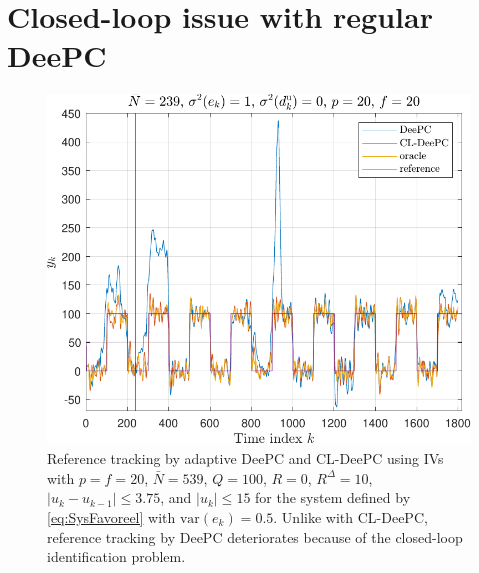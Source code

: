 \section{Closed-loop issue with regular \ac{DeePC}}\label{sec:CL_ID_issue}




\begin{figure}
\begin{center}
\includegraphics[width=\columnwidth]{results/figures/DeePC_CL_ID_issue_Re_1.mat_Nbar_239_p_20_f_20_Ru_1_Rdu_0_Q_100_R_0_dR_10.pdf}    %
\caption{Reference tracking by adaptive \ac{DeePC} and \ac{CL-DeePC} using \ac{IVs} with $p=f=20$, $\bar{N}=539$, $Q=100$, $R=0$, $R^\Delta=10$, $|u_k-u_{k-1}|\leq3.75$, and $|u_k|\leq15$ for the system defined by \eqref{eq:SysFavoreel} with $\text{var}(e_k)=0.5$. %
Unlike with \ac{CL-DeePC}, reference tracking by \ac{DeePC} deteriorates because of the closed-loop identification problem.}  %
\label{fig:CL_Problem_Solution}                                 %
\end{center}                                 %
\end{figure}
